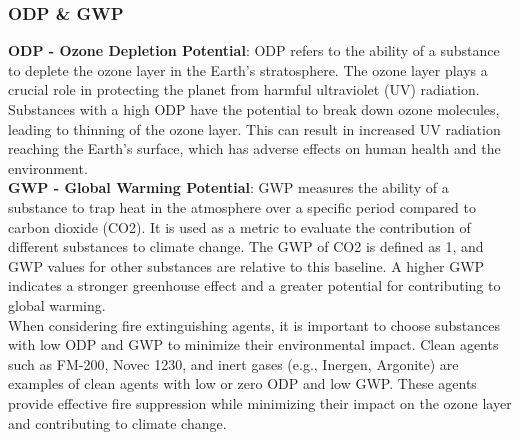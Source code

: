 \documentclass{article}
\begin{document}
\subsubsection*{ODP \& GWP}
\textbf{ODP - Ozone Depletion Potential}: ODP refers to the ability of a substance to deplete the ozone layer in the Earth's stratosphere. The ozone layer plays a crucial role in protecting the planet from harmful ultraviolet (UV) radiation. Substances with a high ODP have the potential to break down ozone molecules, leading to thinning of the ozone layer. This can result in increased UV radiation reaching the Earth's surface, which has adverse effects on human health and the environment.\\

\textbf{GWP - Global Warming Potential}: GWP measures the ability of a substance to trap heat in the atmosphere over a specific period compared to carbon dioxide (CO2). It is used as a metric to evaluate the contribution of different substances to climate change. The GWP of CO2 is defined as 1, and GWP values for other substances are relative to this baseline. A higher GWP indicates a stronger greenhouse effect and a greater potential for contributing to global warming.\\

When considering fire extinguishing agents, it is important to choose substances with low ODP and GWP to minimize their environmental impact. Clean agents such as FM-200, Novec 1230, and inert gases (e.g., Inergen, Argonite) are examples of clean agents with low or zero ODP and low GWP. These agents provide effective fire suppression while minimizing their impact on the ozone layer and contributing to climate change.
\end{document}
